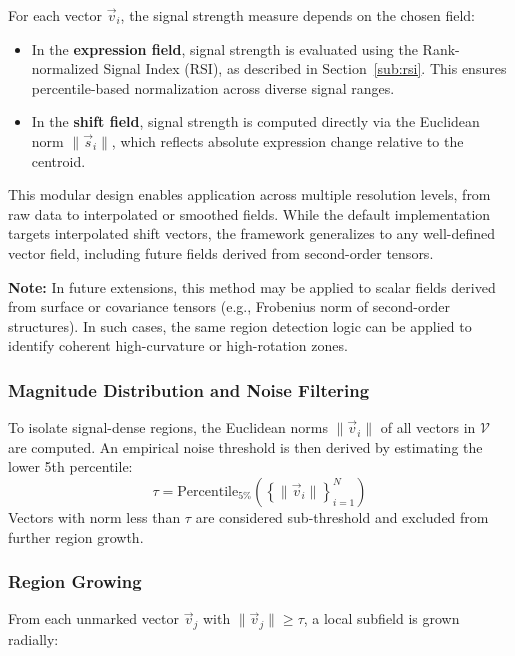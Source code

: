             For each vector \( \vec{v}_i \), the signal strength measure depends on the chosen field:
            \begin{itemize}
                \item In the \textbf{expression field}, signal strength is evaluated using the Rank-normalized Signal Index (RSI), as described in Section~\ref{sub:rsi}. This ensures percentile-based normalization across diverse signal ranges.
                \item In the \textbf{shift field}, signal strength is computed directly via the Euclidean norm \( \| \vec{s}_i \| \), which reflects absolute expression change relative to the centroid.
            \end{itemize}

            This modular design enables application across multiple resolution levels, from raw data to interpolated or smoothed fields. While the default implementation targets interpolated shift vectors, the framework generalizes to any well-defined vector field, including future fields derived from second-order tensors.

            \textbf{Note:} In future extensions, this method may be applied to scalar fields derived from surface or covariance tensors (e.g., Frobenius norm of second-order structures). In such cases, the same region detection logic can be applied to identify coherent high-curvature or high-rotation zones.

        \subsubsection{Magnitude Distribution and Noise Filtering}

            To isolate signal-dense regions, the Euclidean norms \( \| \vec{v}_i \| \) of all vectors in \( \mathcal{V} \) are computed. An empirical noise threshold is then derived by estimating the lower 5th percentile:
            \[
                \tau = \text{Percentile}_{5\%} \left( \left\{ \| \vec{v}_i \| \right\}_{i=1}^N \right)
            \]
            Vectors with norm less than \( \tau \) are considered sub-threshold and excluded from further region growth.

        \subsubsection{Region Growing}

            From each unmarked vector \( \vec{v}_j \) with \( \| \vec{v}_j \| \geq \tau \), a local subfield is grown radially:

